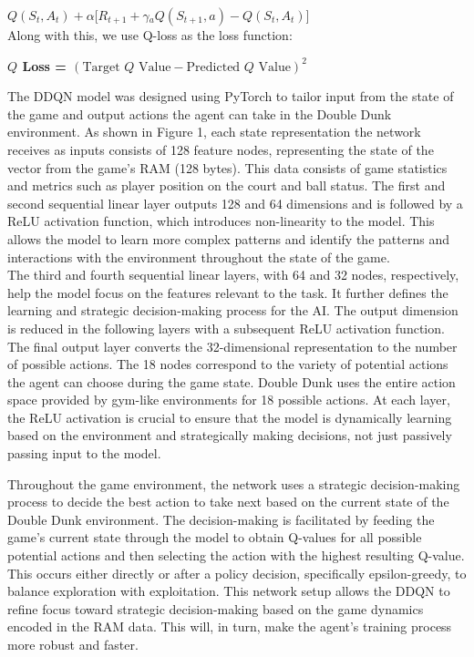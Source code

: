 \documentclass[letterpaper, 10 pt, conference]{ieeeconf}
\begin{document}
\textbf{ $Q(S_t, A_t) + \alpha[R_{t+1} + \gamma $$_a{Q(S_{t+1}, a)} - Q(S_t, A_t)]$} \\

\noindent Along with this, we use Q-loss as the loss function:
\begin{center}
    \textbf{$Q$ Loss = $(\text{Target $Q$ Value} - \text{Predicted $Q$ Value})^2$}
\end{center} 
\vspace{.5cm}
The DDQN model was designed using PyTorch to tailor input from the state of the game and output actions the agent can take in the Double Dunk environment. As shown in Figure 1, each state representation the network receives as inputs consists of 128 feature nodes, representing the state of the vector from the game’s RAM (128 bytes). This data consists of game statistics and metrics such as player position on the court and ball status. The first and second sequential linear layer outputs 128 and 64 dimensions and is followed by a ReLU activation function, which introduces non-linearity to the model. This allows the model to learn more complex patterns and identify the patterns and interactions with the environment throughout the state of the game. \\

The third and fourth sequential linear layers, with 64 and 32 nodes, respectively, help the model focus on the features relevant to the task. It further defines the learning and strategic decision-making process for the AI. The output dimension is reduced in the following layers with a subsequent ReLU activation function. The final output layer converts the 32-dimensional representation to the number of possible actions. The 18 nodes correspond to the variety of potential actions the agent can choose during the game state. Double Dunk uses the entire action space provided by gym-like environments for 18 possible actions. At each layer, the ReLU activation is crucial to ensure that the model is dynamically learning based on the environment and strategically making decisions, not just passively passing input to the model. \\


\vspace{.6cm} 

Throughout the game environment, the network uses a strategic decision-making process to decide the best action to take next based on the current state of the Double Dunk environment. The decision-making is facilitated by feeding the game's current state through the model to obtain Q-values for all possible potential actions and then selecting the action with the highest resulting Q-value. This occurs either directly or after a policy decision, specifically epsilon-greedy, to balance exploration with exploitation. This network setup allows the DDQN to refine focus toward strategic decision-making based on the game dynamics encoded in the RAM data. This will, in turn, make the agent's training process more robust and faster.
\end{document}
